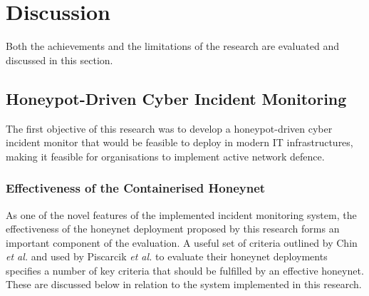 %
%


\section{Discussion} \label{DiscussionOfEvaluation}
Both the achievements and the limitations of the research are evaluated and discussed in this section. 

\subsection{Honeypot-Driven Cyber Incident Monitoring}
The first objective of this research was to develop a honeypot-driven cyber incident monitor that would be feasible to deploy in modern IT infrastructures, making it feasible for organisations to implement active network defence.

\subsubsection{Effectiveness of  the Containerised Honeynet}
As one of the novel features of the implemented incident monitoring system, the effectiveness of the honeynet deployment proposed by this research forms an important component of the evaluation. A useful set of criteria outlined by Chin \textit{et al.} \cite{5319295} and used by Piscarcik \textit{et al.} \cite{Pisarcik:2014:FDV:2659651.2659685} to evaluate their honeynet deployments specifies a number of key criteria that should be fulfilled by an effective honeynet. These are discussed below in relation to the system implemented in this research.

